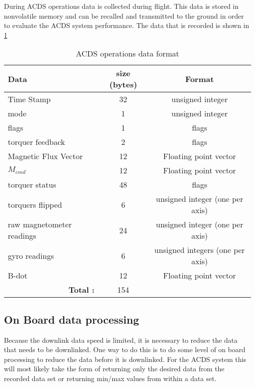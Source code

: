During \ac{ACDS} operations data is collected during flight. This data is stored in nonvolatile memory and can be recalled and transmitted to the ground in order to evaluate the \ac{ACDS} system performance. The data that is recorded is shown in \cref{tab:logdat}

\begin{table}[H]
    \centering
    \caption{\ac{ACDS} operations data format}
    \label{tab:logdat}
    \begin{tabular}{|l|c|c|}
        \hline
        Data&size (bytes)&Format\\
        \hline
        Time Stamp&32&unsigned integer\\
        \hline
        mode&1&unsigned integer\\
        \hline
        flags&1&flags\\
        \hline
        torquer feedback&2&flags\\
        \hline
        Magnetic Flux Vector&12&Floating point vector\\
        \hline
        $M_{cmd}$&12&Floating point vector\\
        \hline
        torquer status&48&flags\\
        \hline
        torquers flipped&6&unsigned integer (one per axis)\\
        \hline
        raw magnetometer readings&24&unsigned integer (one per axis)\\
        \hline
        gyro readings&6&unsigned integers (one per axis)\\
        \hline
        B-dot&12&Floating point vector\\
        \hline
        \multicolumn{1}{|r|}{\bfseries Total :}&154&\\
        \hline
    \end{tabular}
\end{table}

\subsection{On Board data processing}

Because the downlink data speed is limited, it is necessary to reduce the data that needs to be downlinked. One way to do this is to do some level of on board processing to reduce the data before it is downlinked. For the \ac{ACDS} system this will most likely take the form of returning only the desired data from the recorded data set or returning min/max values from within a data set. 

